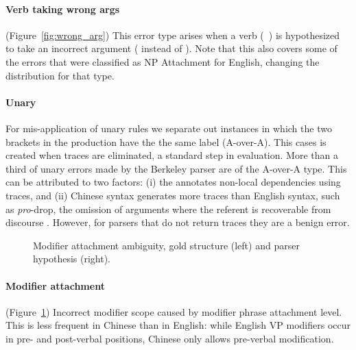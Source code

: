 \paragraph{Verb taking wrong args} (Figure~\ref{fig:wrong_arg})
This error type
arises when a verb \mbox{(\myeg~)} is hypothesized to take
an incorrect argument (\mbox{} instead of
\mbox{}).  Note that this also covers some of the errors
that were classified as NP Attachment for English, changing
the distribution for that type.

\paragraph{Unary}
For mis-application of unary rules we separate out instances in which the two brackets in the production have the the same label (A-over-A).
This cases is created when traces are eliminated, a standard step in evaluation.
More than a third of unary errors made by the Berkeley parser are of the A-over-A type.
This can be attributed to two factors: (i) the \pctb annotates non-local dependencies using traces, and (ii) Chinese syntax generates more traces than English syntax, such as \emph{pro}-drop, the omission of arguments where the referent is recoverable from discourse \parencite{Guo-Wang-VanGenabith:2007:EMNLP}.
However, for parsers that do not return traces they are a benign error.

\begin{figure}
\centering
  \caption{Modifier attachment ambiguity, gold structure (left) and parser hypothesis (right).}\label{fig:mod_att}
\end{figure}

\paragraph{Modifier attachment} (Figure~\ref{fig:mod_att})  Incorrect modifier
scope caused by modifier phrase attachment level. This is less frequent in
Chinese than in English: while English VP modifiers occur in pre- and
post-verbal positions, Chinese only allows pre-verbal modification.

